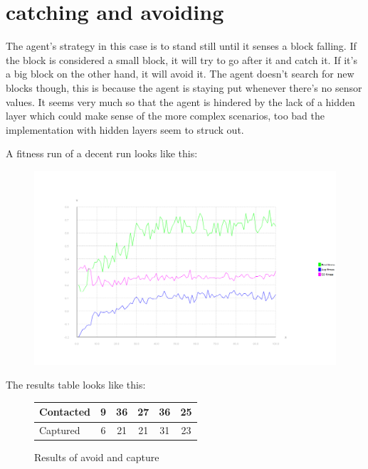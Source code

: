 \documentclass[12pt, a4paper]{article}
\begin{document}
\section{catching and avoiding}
The agent's strategy in this case is to stand still until it senses a block falling. If the block is considered a small block, it will try to go after it and catch it. If it's a big block on the other hand, it will avoid it. The agent doesn't search for new blocks though, this is because the agent is staying put whenever there's no sensor values. It seems very much so that the agent is hindered by the lack of a hidden layer which could make sense of the more complex scenarios, too bad the implementation with hidden layers seem to struck out. 

A fitness run of a decent run looks like this:
\begin{figure}
\includegraphics{catch_avoid_dump}
\end{figure}

The results table looks like this:

\begin{figure}[H]
	\begin{center}
		\begin{tabular}{l | c | c |c |c |c }
		 Contacted& 9 & 36 & 27 & 36 & 25\\ \hline
		 Captured & 6 & 21 & 21 & 31 & 23\\
		 
		\end{tabular}
	\end{center}
	\caption{Results of avoid and capture}
\end{figure}
\end{document}
